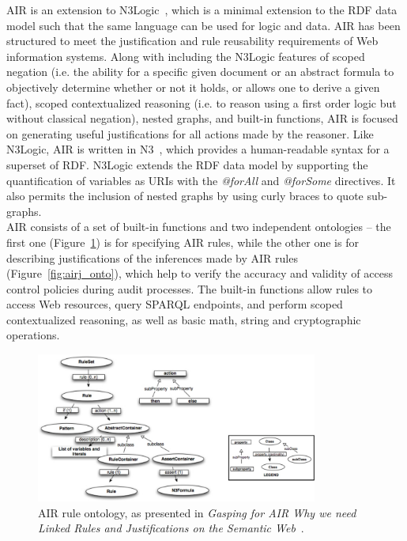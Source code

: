 AIR is an extension to N3Logic~\cite{berners2008n3logic}, which is a minimal extension to the RDF data model such that the same language can be used for logic and data. AIR has been structured to meet the justification and rule reusability requirements of Web information systems. Along with including the N3Logic features of scoped negation (i.e. the ability for a specific given document or an abstract formula to objectively determine whether or not it holds, or allows one to derive a given fact), scoped contextualized reasoning (i.e. to reason using a first order logic but without classical negation), nested graphs, and built-in functions, AIR is focused on generating useful justifications for all actions made by the reasoner. Like N3Logic, AIR is written in N3~\cite{berners2000primer}, which provides a human-readable syntax for a superset of RDF. N3Logic extends the RDF data model by supporting the quantification of variables as URIs with the \textit{@forAll} and \textit{@forSome} directives. It also permits the inclusion of nested graphs by using curly braces to quote sub-graphs.\\

AIR consists of a set of built-in functions and two independent ontologies -- the first one (Figure~\ref{fig:airr_onto}) is for specifying AIR rules, while the other one is for describing justifications of the inferences made by AIR rules (Figure~\ref{fig:airj_onto}), which help to verify the accuracy and validity of access control policies during audit processes. The built-in functions allow rules to access Web resources, query SPARQL endpoints, and perform scoped contextualized reasoning, as well as basic math, string and cryptographic operations.\\

\begin{figure}[h]
  \begin{center}
    \includegraphics[width=350px]{img/air_ontology.jpg}
        \caption{AIR rule ontology, as presented in \textit{Gasping for AIR Why we need Linked Rules and Justifications on the Semantic Web}~\cite{kagal2011gasping}.}
        \label{fig:airr_onto}
  \end{center}
\end{figure}

